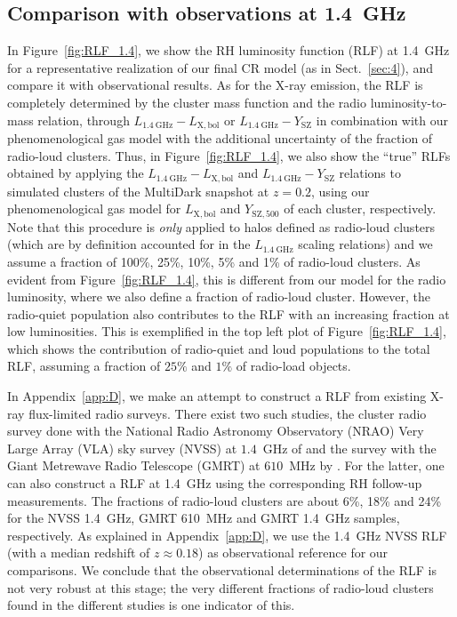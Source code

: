 \documentclass[traditabstract]{aa}
\newcommand{\rmn}{\mathrm}
\begin{document}
\subsection{Comparison with observations at 1.4~GHz}

In Figure~\ref{fig:RLF_1.4}, we show the RH luminosity function (RLF) at 1.4~GHz
for a representative realization of our final CR model (as in
Sect.~\ref{sec:4}), and compare it with observational results. As for the X-ray
emission, the RLF is completely determined by the cluster mass function and the
radio luminosity-to-mass relation, through $L_{1.4~\rmn{GHz}}-L_{ \rmn{X,bol}}$
or $L_{1.4~\rmn{GHz}}-Y_{\rmn{SZ}}$ in combination with our phenomenological gas
model with the additional uncertainty of the fraction of radio-loud
clusters. Thus, in Figure~\ref{fig:RLF_1.4}, we also show the ``true'' RLFs
obtained by applying the $L_{1.4~\rmn{GHz}}-L_{\rmn{X,bol}}$ and
$L_{1.4~\rmn{GHz}}-Y_{\rmn{SZ}}$ relations to simulated clusters of the
MultiDark snapshot at $z = 0.2$, using our phenomenological gas model for
$L_{\rmn{X,bol}}$ and $Y_{\rmn{SZ}, 500}$ of each cluster, respectively. Note
that this procedure is {\em only} applied to halos defined as radio-loud
clusters (which are by definition accounted for in the $L_{1.4~\rmn{GHz}}$
scaling relations) and we assume a fraction of 100\%, 25\%, 10\%, 5\% and 1\% of
radio-loud clusters. As evident from Figure~\ref{fig:RLF_1.4}, this is different
from our model for the radio luminosity, where we also define a fraction of
radio-loud cluster. However, the radio-quiet population also contributes to the
RLF with an increasing fraction at low luminosities. This is exemplified in the
top left plot of Figure~\ref{fig:RLF_1.4}, which shows the contribution of
radio-quiet and loud populations to the total RLF, assuming a fraction of $25\%$
and $1\%$ of radio-load objects.

In Appendix~\ref{app:D}, we make an attempt to construct a RLF from existing
X-ray flux-limited radio surveys. There exist two such studies, the cluster
radio survey done with the National Radio Astronomy Observatory (NRAO) Very
Large Array (VLA) sky survey (NVSS) at $1.4$~GHz of \cite{1999NewA....4..141G}
and the survey with the Giant Metrewave Radio Telescope (GMRT) at $610$~MHz by
\cite{VenturiGMRT_1,VenturiGMRT_2}. For the latter, one can also construct a RLF
at 1.4~GHz using the corresponding RH follow-up measurements. The fractions of
radio-loud clusters are about 6\%, 18\% and 24\% for the NVSS 1.4~GHz, GMRT
610~MHz and GMRT 1.4~GHz samples, respectively. As explained in
Appendix~\ref{app:D}, we use the 1.4~GHz NVSS RLF (with a median redshift of $z
\approx 0.18$) as observational reference for our comparisons. We conclude that
the observational determinations of the RLF is not very robust at this stage;
the very different fractions of radio-loud clusters found in the different
studies is one indicator of this.
 
\end{document}
